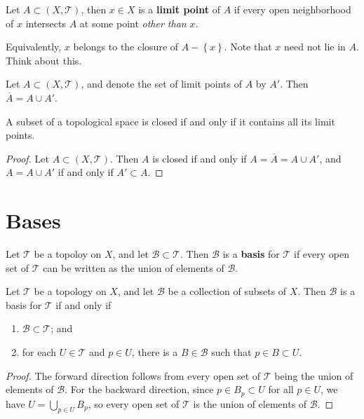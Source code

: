 \documentclass[twoside,10pt]{report}
\begin{document}
\begin{defn}
Let $A \subset (X,\mathcal{T})$, then $x \in X$ is a \textbf{limit point} of $A$ if every open neighborhood of $x$ intersects $A$ at some point \textit{other than} $x$.

	Equivalently, $x$ belongs to the closure of $A - \left\{ x \right\}$. Note that $x$ need not lie in $A$. {\color{red}Think about this.}
\end{defn}

\begin{thrm}
	Let $A \subset (X,\mathcal{T})$, and denote the set of limit points of $A$ by $A'$. Then $\overline{A}=A \cup A'$.
\end{thrm}

\begin{cor}
	A subset of a topological space is closed if and only if it contains all its limit points.
\end{cor}
\begin{proof}
	Let $A \subset (X, \mathcal{T})$. Then $A$ is closed if and only if $A = \overline{A} = A \cup A'$, and $A = A \cup A'$ if and only if $A' \subset A$.
\end{proof}


\section{Bases}

\begin{defn}
Let $\mathcal{T}$ be a topoloy on $X$, and let $\mathcal{B} \subset \mathcal{T}$. Then $\mathcal{B}$ is a \textbf{basis} for $\mathcal{T}$ if every open set of $\mathcal{T}$ can be written as the union of elements of $\mathcal{B}$.
\end{defn}

\begin{prop}
\label{prop:basis-specific-top}
Let $\mathcal{T}$ be a topology on $X$, and let $\mathcal{B}$ be a collection of subsets of $X$. Then $\mathcal{B}$ is a basis for $\mathcal{T}$ if and only if
\begin{enumerate}
	\item $\mathcal{B}\subset \mathcal{T}$; and
	\item for each $U \in \mathcal{T}$ and $p \in U$, there is a $B \in \mathcal{B}$ such that $p \in B \subset U$.
\end{enumerate}
\end{prop}
\begin{proof}
	The forward direction follows from every open set of $\mathcal{T}$ being the union of elements of $\mathcal{B}$. For the backward direction, since $p \in B_p \subset U$ for all $p \in U$, we have $U = \bigcup_{p\in U}B_p$, so every open set of $\mathcal{T}$ is the union of elements of $\mathcal{B}$. 
\end{proof}
\end{document}
